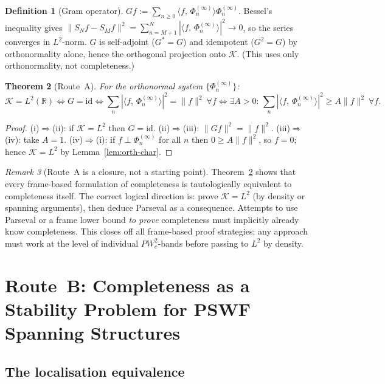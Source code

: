 \documentclass[12pt,a4paper]{amsart}
\newtheorem{theorem}{Theorem}[section]
\theoremstyle{definition}
\newtheorem{definition}[theorem]{Definition}
\theoremstyle{remark}
\newtheorem{remark}[theorem]{Remark}
\newcommand{\norm}[1]{\|#1\|}
\newcommand{\ip}[2]{\langle #1,\, #2\rangle}
\newcommand{\Phiinf}[1]{\Phi_{#1}^{(\infty)}}
\newcommand{\PW}{PW}
\newcommand{\Kspace}{\mathcal{K}}
\begin{document}
\begin{definition}[Gram operator]
\label{def:gram}
$Gf := \sum_{n\ge 0}\ip{f}{\Phiinf{n}}\Phiinf{n}$.
Bessel's inequality gives
$\norm{S_Nf-S_Mf}^2 = \sum_{n=M+1}^N
|\ip{f}{\Phiinf{n}}|^2\to 0$,
so the series converges in $L^2$-norm.
$G$ is self-adjoint ($G^*=G$) and idempotent
($G^2=G$) by orthonormality alone,
hence the orthogonal projection onto $\Kspace$.
(This uses only orthonormality, not completeness.)
\end{definition}

\begin{theorem}[Route~A]
\label{thm:routeA}
For the orthonormal system $\{\Phiinf{n}\}$:
\[
  \Kspace = L^2(\mathbb{R})
  \iff G = \mathrm{id}
  \iff \textstyle\sum_n|\ip{f}{\Phiinf{n}}|^2 = \norm{f}^2\ \forall f
  \iff \exists A{>}0:\,
    \textstyle\sum_n|\ip{f}{\Phiinf{n}}|^2 \ge A\norm{f}^2\ \forall f.
\]
\end{theorem}
\begin{proof}
(i)$\Rightarrow$(ii): if $\Kspace=L^2$ then $G=\mathrm{id}$.
(ii)$\Rightarrow$(iii): $\norm{Gf}^2=\norm{f}^2$.
(iii)$\Rightarrow$(iv): take $A=1$.
(iv)$\Rightarrow$(i): if $f\perp\Phiinf{n}$ for all $n$
then $0\ge A\norm{f}^2$, so $f=0$;
hence $\Kspace=L^2$ by Lemma~\ref{lem:orth-char}.
\end{proof}

\begin{remark}[Route~A is a closure, not a starting point]
\label{rem:routeA-consequence}
Theorem~\ref{thm:routeA} shows that every
frame-based formulation of completeness is
tautologically equivalent to completeness itself.
The correct logical direction is:
prove $\Kspace=L^2$ (by density or spanning arguments),
then deduce Parseval as a consequence.
Attempts to use Parseval or a frame lower bound
\emph{to prove} completeness must implicitly already
know completeness.
This closes off all frame-based proof strategies;
any approach must work at the level of individual
$\PW_c^2$-bands before passing to $L^2$ by density.
\end{remark}

\section{Route~B: Completeness as a Stability Problem
  for PSWF Spanning Structures}
\label{sec:routeB}

\subsection{The localisation equivalence}
\end{document}
